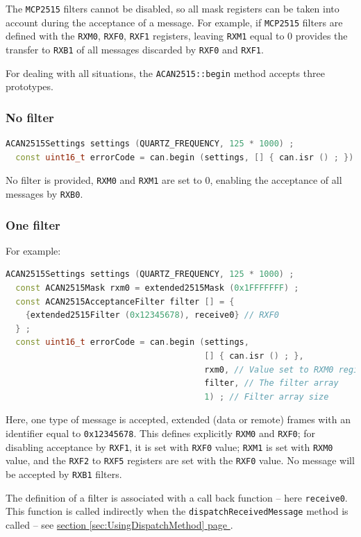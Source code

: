 \documentclass[10pt, a4paper, obeyspaces]{extarticle}
\newcommand\refSectionPage[1]{\hyperref[sec:#1]{section \ref*{sec:#1} page \pageref{sec:#1}}}
\newcommand \subsubsectionLabel[2]{\subsubsection{#1}\label{subsubsec:#2}}
\begin{document}
The \texttt{MCP2515} filters cannot be disabled, so all mask registers can be taken into account during the acceptance of a message. For example, if \texttt{MCP2515} filters are defined with the \texttt{RXM0}, \texttt{RXF0}, \texttt{RXF1} registers, leaving \texttt{RXM1} equal to $0$ provides the transfer to \texttt{RXB1} of all messages discarded by \texttt{RXF0} and \texttt{RXF1}.

For dealing with all situations, the \texttt{ACAN2515::begin} method accepts three prototypes.

\subsubsectionLabel{No filter}{noFilter}
{ \small\begin{lstlisting}[language=c++]
  ACAN2515Settings settings (QUARTZ_FREQUENCY, 125 * 1000) ;
  const uint16_t errorCode = can.begin (settings, [] { can.isr () ; }) ;
\end{lstlisting}}
No filter is provided, \texttt{RXM0} and \texttt{RXM1} are set to $0$, enabling the acceptance of all messages by \texttt{RXB0}.



\subsubsectionLabel{One filter}{oneFilter}

For example:
{ \small\begin{lstlisting}[language=c++]
  ACAN2515Settings settings (QUARTZ_FREQUENCY, 125 * 1000) ;
  const ACAN2515Mask rxm0 = extended2515Mask (0x1FFFFFFF) ;
  const ACAN2515AcceptanceFilter filter [] = {
    {extended2515Filter (0x12345678), receive0} // RXF0
  } ;
  const uint16_t errorCode = can.begin (settings,
                                        [] { can.isr () ; },
                                        rxm0, // Value set to RXM0 register
                                        filter, // The filter array
                                        1) ; // Filter array size
\end{lstlisting}}

Here, one type of message is accepted, extended (data or remote) frames with an identifier equal to \texttt{0x12345678}. This defines explicitly \texttt{RXM0} and \texttt{RXF0}; for disabling acceptance by \texttt{RXF1}, it is set with \texttt{RXF0} value; \texttt{RXM1} is set with \texttt{RXM0} value, and the \texttt{RXF2} to \texttt{RXF5} registers are set with the \texttt{RXF0} value. No message will be accepted by \texttt{RXB1} filters.

The definition of a filter is associated with a call back function -- here \texttt{receive0}. This function is called indirectly when the \texttt{dispatchReceivedMessage} method is called -- see \refSectionPage{UsingDispatchMethod}.
\end{document}
